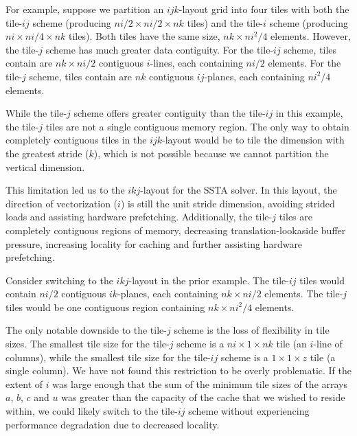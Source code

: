 \documentclass{sig-alternate-05-2015}
\begin{document}
For example, suppose we partition an \(ijk\)-layout grid into four tiles with
  both the tile-\(ij\) scheme (producing \(ni/2 \times ni/2 \times nk\) tiles)
  and the tile-\(i\) scheme (producing \(ni \times ni/4 \times nk\) tiles).
Both tiles have the same size, \(nk \times ni^2/4\) elements.
However, the tile-\(j\) scheme has much greater data contiguity.
For the tile-\(ij\) scheme, tiles contain are \(nk \times ni/2\) contiguous
  \(i\)-lines, each containing \(ni/2\) elements.
For the tile-\(j\) scheme, tiles contain are \(nk\) contiguous \(ij\)-planes,
  each containing \(ni^2/4\) elements.

While the tile-\(j\) scheme offers greater contiguity than the
  tile-\(ij\) in this example, the tile-\(j\) tiles are not a single contiguous
  memory region.
The only way to obtain completely contiguous tiles in the \(ijk\)-layout would
  be to tile the dimension with the greatest stride (\(k\)), which is not possible
  because we cannot partition the vertical dimension.

This limitation led us to the \(ikj\)-layout for the SSTA solver.
In this layout, the direction of vectorization (\(i\)) is still the unit stride
  dimension, avoiding strided loads and assisting hardware prefetching.
Additionally, the tile-\(j\) tiles are completely contiguous regions of memory,
  decreasing translation-lookaside buffer pressure, increasing locality for
  caching and further assisting hardware prefetching.

Consider switching to the \(ikj\)-layout in the prior example.
The tile-\(ij\) tiles would contain \(ni/2\) contiguous \(ik\)-planes, each
  containing \(nk \times ni/2\) elements.
The tile-\(j\) tiles would be one contiguous region containing
  \(nk \times ni^2/4\) elements.


The only notable downside to the tile-\(j\) scheme is the loss of
  flexibility in tile sizes.
The smallest tile size for the tile-\(j\) scheme is a \(ni \times 1 \times nk\)
  tile (an \(i\)-line of columns), while the smallest tile size for the
  tile-\(ij\) scheme is a \(1 \times 1 \times z\) tile (a single column).
We have not found this restriction to be overly problematic.
If the extent of \(i\) was large enough that the sum of the minimum tile sizes of
  the arrays \(a\), \(b\), \(c\) and \(u\) was greater than the capacity of the
  cache that we wished to reside within, we could likely switch to the tile-\(ij\)
  scheme without experiencing performance degradation due to decreased locality.
\end{document}

